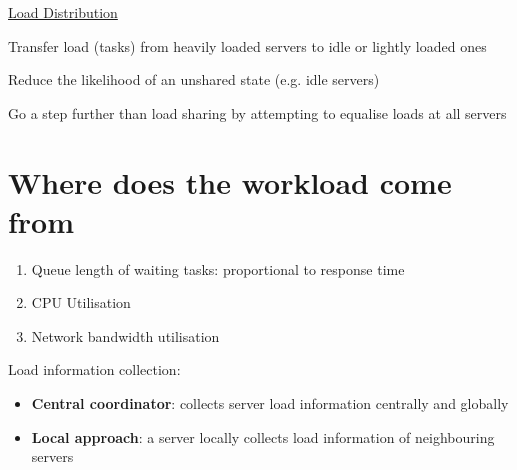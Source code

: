 \documentclass{article}[18pt]
\begin{document}
\begin{center}
\underline{\huge Load Distribution}
\end{center}
\begin{definition}
Transfer load (tasks) from heavily loaded servers to idle or lightly loaded ones
\end{definition}
\begin{definition}
Reduce the likelihood of an unshared state (e.g. idle servers)
\end{definition}
\begin{definition}
Go a step further than load sharing by attempting to equalise loads at all servers
\end{definition}
\section{Where does the workload come from}
\begin{enumerate}
	\item Queue length of waiting tasks: proportional to response time
	\item CPU Utilisation
	\item Network bandwidth utilisation
\end{enumerate}
Load information collection:
\begin{itemize}
	\item \textbf{Central coordinator}: collects server load information centrally and globally
	\item \textbf{Local approach}: a server locally collects load information of neighbouring servers
\end{itemize}
\end{document}
